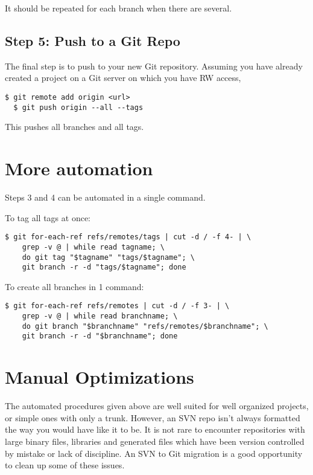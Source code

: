 \documentclass{../common/tufte-latex/tufte-handout}
\begin{document}
It should be repeated for each branch when there are several.

\subsection{Step 5: Push to a Git Repo}

The final step is to push to your new Git repository.
Assuming you have already created a project on a Git server on which you have RW access,

\begin{lstlisting}[style=BashInputStyle]
  $ git remote add origin <url>
  $ git push origin --all --tags
\end{lstlisting}

This pushes all branches and all tags.

\section{More automation}

Steps 3 and 4 can be automated in a single command.

To tag all tags at once:
\begin{lstlisting}[style=BashInputStyle]
  $ git for-each-ref refs/remotes/tags | cut -d / -f 4- | \
    grep -v @ | while read tagname; \
    do git tag "$tagname" "tags/$tagname"; \
    git branch -r -d "tags/$tagname"; done
\end{lstlisting}

To create all branches in 1 command:
\begin{lstlisting}[style=BashInputStyle]
  $ git for-each-ref refs/remotes | cut -d / -f 3- | \
    grep -v @ | while read branchname; \
    do git branch "$branchname" "refs/remotes/$branchname"; \
    git branch -r -d "$branchname"; done
\end{lstlisting}

\section{Manual Optimizations}

The automated procedures given above are well suited for well organized projects, or simple ones with only a trunk.
However, an SVN repo isn't always formatted the way you would have like it to be.
It is not rare to encounter repositories with large binary files, libraries and generated files which have been version controlled by mistake or lack of discipline.
An SVN to Git migration is a good opportunity to clean up some of these issues.
\end{document}
